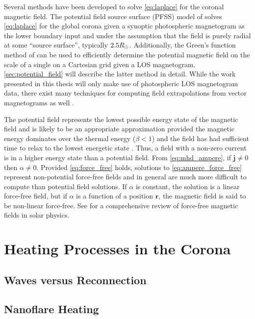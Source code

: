 Several methods have been developed to solve \autoref{eq:laplace} for the coronal magnetic field. The potential field source surface (PFSS) model of \citet{schatten_model_1969} solves \autoref{eq:laplace} for the global corona given a synoptic photospheric magnetogram as the lower boundary input and under the assumption that the field is purely radial at some ``source surface'', typically $2.5R_{\odot}$. Additionally, the Green's function method of \citet{schmidt_observable_1964} can be used to efficiently determine the potential magnetic field on the scale of a single \AR{} on a Cartesian grid given a LOS magnetogram. \autoref{sec:potential_field} will describe the latter method in detail. While the work presented in this thesis will only make use of photospheric LOS magnetogram data, there exist many techniques for computing field extrapolations from vector magnetograms as well \citep[see review by][]{welsch_deriving_2016}.

The potential field represents the lowest possible energy state of the magnetic field and is likely to be an appropriate approximation provided the magnetic energy dominates over the thermal energy ($\beta<1$) and the field has had sufficient time to relax to the lowest energetic state \citep{priest_magnetohydrodynamics_2014}. Thus, a field with a non-zero current is in a higher energy state than a potential field. From \autoref{eq:mhd_ampere}, if $\mathbf{j}\neq0$ then $\alpha\neq0$. Provided \autoref{eq:force_free} holds, solutions to \autoref{eq:ampere_force_free} represent non-potential force-free fields and in general are much more difficult to compute than potential field solutions. If $\alpha$ is constant, the solution is a linear force-free field, but if $\alpha$ is a function of a position $\mathbf{r}$, the magnetic field is said to be non-linear force-free. See \citet{wiegelmann_solar_2012} for a comprehensive review of force-free magnetic fields in solar physics. 

\section{Heating Processes in the Corona}

\subsection{Waves versus Reconnection}

\subsection{Nanoflare Heating}

